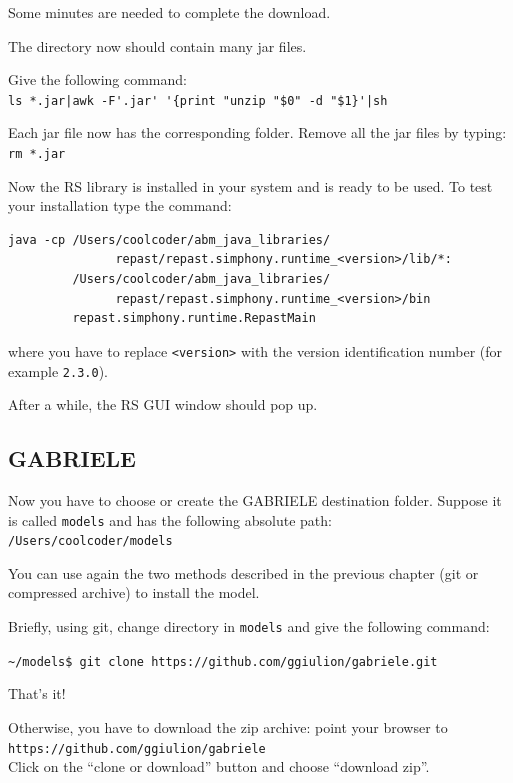 \documentclass{book}
\begin{document}
Some minutes are needed to complete the download.%

The directory now should contain many jar files.

Give the following command:\\
\verb+ls *.jar|awk -F'.jar' '{print "unzip "$0" -d "$1}'|sh+

Each jar file now has the corresponding folder.
Remove all the jar files by typing:\\
\verb+rm *.jar+

Now the RS library is installed in your system and is ready to be used.
To test your installation type the command:\\
\begin{verbatim}
java -cp /Users/coolcoder/abm_java_libraries/
               repast/repast.simphony.runtime_<version>/lib/*:
         /Users/coolcoder/abm_java_libraries/
               repast/repast.simphony.runtime_<version>/bin 
         repast.simphony.runtime.RepastMain
\end{verbatim}
where you have to replace \verb+<version>+ with the version identification number (for example \verb+2.3.0+).

After a while, the RS GUI window should pop up.




\subsection{GABRIELE}

Now you have to choose or create the GABRIELE destination folder.
Suppose it is called \verb+models+ and has the following absolute path: \\
\verb+/Users/coolcoder/models+

You can use again the two methods described in the previous chapter (git or compressed archive) to install the model. 

Briefly, using git, change directory in \verb+models+ and give the following command:

\vskip2mm
\noindent\verb+~/models$ +\color{red}\verb+git clone https://github.com/ggiulion/gabriele.git+ \color{black}

\vskip2mm
That's it!

Otherwise, you have to download the zip archive: point your browser to\\ 
\verb+https://github.com/ggiulion/gabriele+\\
Click on the ``clone or download'' button and choose ``download zip''.
\end{document}

